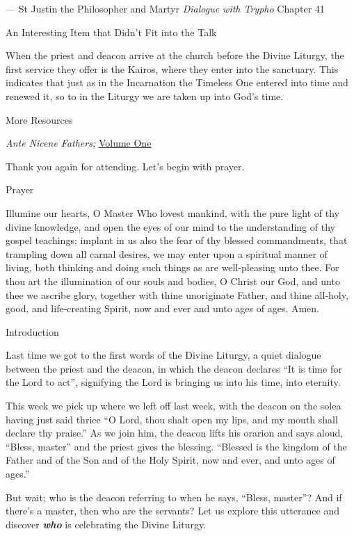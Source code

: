 \documentclass[
]{article}
\begin{document}
--- St Justin the Philosopher and Martyr \emph{Dialogue with Trypho}
Chapter 41

An Interesting Item that Didn't Fit into the Talk

When the priest and deacon arrive at the church before the Divine
Liturgy, the first service they offer is the Kairos, where they enter
into the sanctuary. This indicates that just as in the Incarnation the
Timeless One entered into time and renewed it, so to in the Liturgy we
are taken up into God's time.

More Resources

\emph{Ante Nicene Fathers;}
\href{https://ccel.org/ccel/schaff/anf-series/anf-series}{\ul{Volume
One}}

Thank you again for attending. Let's begin with prayer.

Prayer

Illumine our hearts, O Master Who lovest mankind, with the pure light of
thy divine knowledge, and open the eyes of our mind to the understanding
of thy gospel teachings; implant in us also the fear of thy blessed
commandments, that trampling down all carnal desires, we may enter upon
a spiritual manner of living, both thinking and doing such things as are
well-pleasing unto thee. For thou art the illumination of our souls and
bodies, O Christ our God, and unto thee we ascribe glory, together with
thine unoriginate Father, and thine all-holy, good, and life-creating
Spirit, now and ever and unto ages of ages. Amen.

Introduction

Last time we got to the first words of the Divine Liturgy, a quiet
dialogue between the priest and the deacon, in which the deacon declares
``It is time for the Lord to act'', signifying the Lord is bringing us
into his time, into eternity.

This week we pick up where we left off last week, with the deacon on the
solea having just said thrice ``O Lord, thou shalt open my lips, and my
mouth shall declare thy praise.'' As we join him, the deacon lifts his
orarion and says aloud, ``Bless, master'' and the priest gives the
blessing. ``Blessed is the kingdom of the Father and of the Son and of
the Holy Spirit, now and ever, and unto ages of ages.''

But wait; who is the deacon referring to when he says, ``Bless,
master''? And if there's a master, then who are the servants? Let us
explore this utterance and discover \textbf{\emph{who}} is celebrating
the Divine Liturgy.
\end{document}

